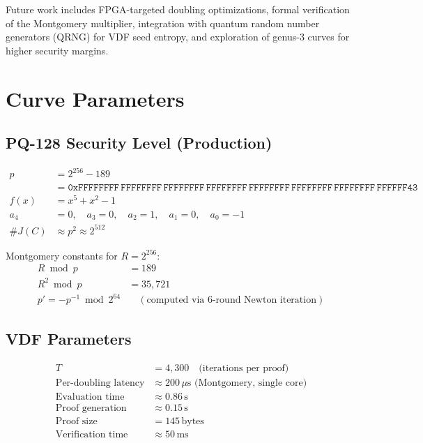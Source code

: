 \documentclass[11pt,a4paper]{article}
\begin{document}
Future work includes FPGA-targeted doubling optimizations, formal verification of the Montgomery multiplier, integration with quantum random number generators (QRNG) for VDF seed entropy, and exploration of genus-3 curves for higher security margins.


\appendix

\section{Curve Parameters}
\label{app:params}

\subsection{PQ-128 Security Level (Production)}

\begin{align*}
    p &= 2^{256} - 189 \\
      &= \mathtt{0xFFFFFFFF\,FFFFFFFF\,FFFFFFFF\,FFFFFFFF\,FFFFFFFF\,FFFFFFFF\,FFFFFFFF\,FFFFFF43} \\
    f(x) &= x^5 + x^2 - 1 \\
    a_4 &= 0, \quad a_3 = 0, \quad a_2 = 1, \quad a_1 = 0, \quad a_0 = -1 \\
    \#J(C) &\approx p^2 \approx 2^{512}
\end{align*}

Montgomery constants for $R = 2^{256}$:
\begin{align*}
    R \bmod p &= 189 \\
    R^2 \bmod p &= 35{,}721 \\
    p' = -p^{-1} \bmod 2^{64} &\quad (\text{computed via 6-round Newton iteration})
\end{align*}

\subsection{VDF Parameters}

\begin{align*}
    T &= 4{,}300 \quad \text{(iterations per proof)} \\
    \text{Per-doubling latency} &\approx 200\,\mu\text{s (Montgomery, single core)} \\
    \text{Evaluation time} &\approx 0.86\,\text{s} \\
    \text{Proof generation} &\approx 0.15\,\text{s} \\
    \text{Proof size} &= 145\,\text{bytes} \\
    \text{Verification time} &\approx 50\,\text{ms}
\end{align*}
\end{document}
